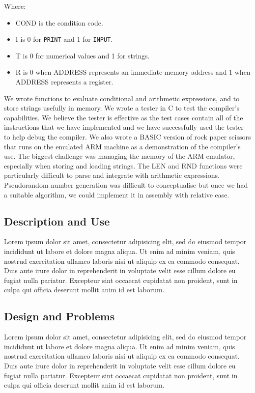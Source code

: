 \documentclass[11pt, letterpaper]{article}
\begin{document}
Where:
\begin{itemize}
\item COND is the condition code.
\item I is 0 for \verb|PRINT| and 1 for \verb|INPUT|.
\item T is 0 for numerical values and 1 for strings.
\item R is 0 when ADDRESS represents an immediate memory address and 1 when ADDRESS represents a register.
\end{itemize}

We wrote functions to evaluate conditional and arithmetic expressions, and to store strings usefully in memory. We wrote a tester in C to test the compiler's capabilities. We believe the tester is effective as the test cases contain all of the instructions that we have implemented and we have successfully used the tester to help debug the compiler. We also wrote a BASIC version of rock paper scissors that runs on the emulated ARM machine as a demonstration of the compiler's use.
The biggest challenge was managing the memory of the ARM emulator, especially when storing and loading strings. The LEN and RND functions were particularly difficult to parse and integrate with arithmetic expressions. Pseudorandom number generation was difficult to conceptualise but once we had a suitable algorithm, we could implement it in assembly with relative ease.

\subsection{Description and Use}
Lorem ipsum dolor sit amet, consectetur adipisicing elit, sed do eiusmod tempor
incididunt ut labore et dolore magna aliqua. Ut enim ad minim veniam, quis
nostrud exercitation ullamco laboris nisi ut aliquip ex ea commodo consequat.
Duis aute irure dolor in reprehenderit in voluptate velit esse cillum dolore eu
fugiat nulla pariatur. Excepteur sint occaecat cupidatat non proident, sunt in
culpa qui officia deserunt mollit anim id est laborum.

\subsection{Design and Problems}
Lorem ipsum dolor sit amet, consectetur adipisicing elit, sed do eiusmod tempor
incididunt ut labore et dolore magna aliqua. Ut enim ad minim veniam, quis
nostrud exercitation ullamco laboris nisi ut aliquip ex ea commodo consequat.
Duis aute irure dolor in reprehenderit in voluptate velit esse cillum dolore eu
fugiat nulla pariatur. Excepteur sint occaecat cupidatat non proident, sunt in
culpa qui officia deserunt mollit anim id est laborum.
\end{document}
